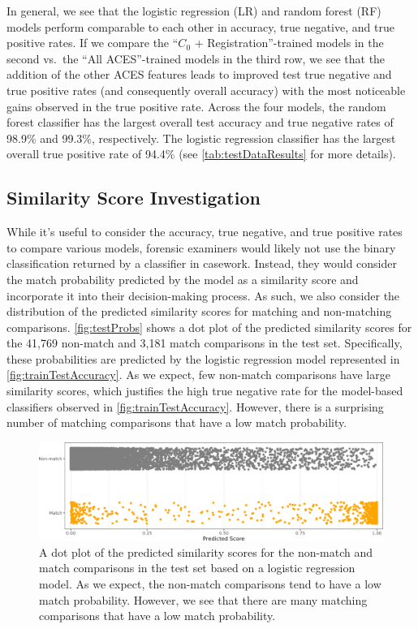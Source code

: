 \documentclass[reprint]{JASA}
\begin{document}
In general, we see that the logistic regression (LR) and random forest
(RF) models perform comparable to each other in accuracy, true negative,
and true positive rates. If we compare the ``\(C_0\) +
Registration''-trained models in the second vs.~the ``All ACES''-trained
models in the third row, we see that the addition of the other ACES
features leads to improved test true negative and true positive rates
(and consequently overall accuracy) with the most noticeable gains
observed in the true positive rate. Across the four models, the random
forest classifier has the largest overall test accuracy and true
negative rates of 98.9\% and 99.3\%, respectively. The logistic
regression classifier has the largest overall true positive rate of
94.4\% (see \autoref{tab:testDataResults} for more details).

\hypertarget{similarity-score-investigation}{%
\subsection{Similarity Score
Investigation}\label{similarity-score-investigation}}

While it's useful to consider the accuracy, true negative, and true
positive rates to compare various models, forensic examiners would
likely not use the binary classification returned by a classifier in
casework. Instead, they would consider the match probability predicted
by the model as a similarity score and incorporate it into their
decision-making process. As such, we also consider the distribution of
the predicted similarity scores for matching and non-matching
comparisons. \autoref{fig:testProbs} shows a dot plot of the predicted
similarity scores for the 41,769 non-match and 3,181 match comparisons
in the test set. Specifically, these probabilities are predicted by the
logistic regression model represented in
\autoref{fig:trainTestAccuracy}. As we expect, few non-match comparisons
have large similarity scores, which justifies the high true negative
rate for the model-based classifiers observed in
\autoref{fig:trainTestAccuracy}. However, there is a surprising number
of matching comparisons that have a low match probability.

\begin{figure}[htbp]

{\centering \includegraphics[width=.5\textwidth]{images/resultsPlots/testProbs_plt} 

}

\caption{\label{fig:testProbs} A dot plot of the predicted similarity scores for the non-match and match comparisons in the test set based on a logistic regression model. As we expect, the non-match comparisons tend to have a low match probability. However, we see that there are many matching comparisons that have a low match probability.}\label{fig:unnamed-chunk-10}
\end{figure}
\end{document}
